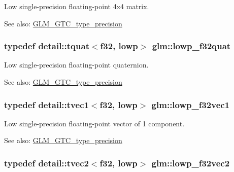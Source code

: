 Low single-precision floating-point 4x4 matrix. \begin{Desc}
\item[See also:]\hyperlink{group__gtc__type__precision}{GLM\_\-GTC\_\-type\_\-precision} \end{Desc}
\hypertarget{group__gtc__type__precision_g83edc5f21bfa41f72f881b29aabbd919}{
\subsubsection[lowp\_\-f32quat]{\setlength{\rightskip}{0pt plus 5cm}typedef detail::tquat$<$f32, lowp$>$ {\bf glm::lowp\_\-f32quat}}}
\label{group__gtc__type__precision_g83edc5f21bfa41f72f881b29aabbd919}


Low single-precision floating-point quaternion. \begin{Desc}
\item[See also:]\hyperlink{group__gtc__type__precision}{GLM\_\-GTC\_\-type\_\-precision} \end{Desc}
\hypertarget{group__gtc__type__precision_ge802918ade0497b72c606430830f5ebb}{
\subsubsection[lowp\_\-f32vec1]{\setlength{\rightskip}{0pt plus 5cm}typedef detail::tvec1$<$f32, lowp$>$ {\bf glm::lowp\_\-f32vec1}}}
\label{group__gtc__type__precision_ge802918ade0497b72c606430830f5ebb}


Low single-precision floating-point vector of 1 component. \begin{Desc}
\item[See also:]\hyperlink{group__gtc__type__precision}{GLM\_\-GTC\_\-type\_\-precision} \end{Desc}
\hypertarget{group__gtc__type__precision_g7faa2c9884c87b1e6512a966adad69e4}{
\subsubsection[lowp\_\-f32vec2]{\setlength{\rightskip}{0pt plus 5cm}typedef detail::tvec2$<$f32, lowp$>$ {\bf glm::lowp\_\-f32vec2}}}
\label{group__gtc__type__precision_g7faa2c9884c87b1e6512a966adad69e4}


